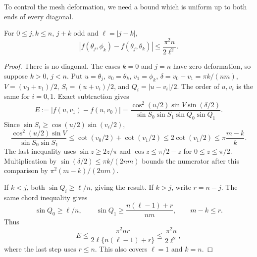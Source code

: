 To control the mesh deformation, we need a bound which is uniform up
to both ends of every diagonal.

\begin{lemma}
\label{lem:asym-details-deformation}
For $0\leq j,k\leq n$, $j+k$ odd and $\ell=|j-k|$,
\begin{equation}\label{eq:asym-details-deformation-bound}
 |f(\theta_j,\phi_k)-f(\theta_j,\theta_k)|
       \leq\frac{\pi^2n}{2\ell^2}.
\end{equation}
\end{lemma}

\begin{proof}
There is no diagonal.  The cases $k=0$ and $j=n$ have zero
deformation, so suppose $k>0$, $j<n$.  Put
$u=\theta_j$, $v_0=\theta_k$, $v_1=\phi_k$,
$\delta=v_0-v_1=\pi k/(nm)$, $V=(v_0+v_1)/2$,
$S_i=(u+v_i)/2$, and $Q_i=|u-v_i|/2$.  The order of $u,v_i$
is the same for $i=0,1$.  Exact subtraction gives
\[
 E:=|f(u,v_1)-f(u,v_0)|
 =\frac{\cos^2(u/2)\sin V\sin(\delta/2)}
        {\sin S_0\sin S_1\sin Q_0\sin Q_1}.
\]
Since $\sin S_i\geq\cos(u/2)\sin(v_i/2)$,
\[
 \frac{\cos^2(u/2)\sin V}{\sin S_0\sin S_1}
 \leq\cot(v_0/2)+\cot(v_1/2)
 \leq2\cot(v_1/2)\leq\pi\frac{m-k}{k}.
\]
The last inequality uses $\sin z\geq2z/\pi$ and
$\cos z\leq\pi/2-z$ for $0\leq z\leq\pi/2$.
Multiplication by $\sin(\delta/2)\leq\pi k/(2nm)$ bounds
the numerator after this comparison by $\pi^2(m-k)/(2nm)$.

If $k<j$, both $\sin Q_i\geq\ell/n$, giving the result.
If $k>j$, write $r=n-j$.  The same chord inequality gives
\[
 \sin Q_0\geq\ell/n,\qquad
 \sin Q_1\geq\frac{n(\ell-1)+r}{nm},\qquad m-k\leq r.
\]
Thus
\[
 E\leq\frac{\pi^2nr}{2\ell\{n(\ell-1)+r\}}
       \leq\frac{\pi^2n}{2\ell^2},
\]
where the last step uses $r\leq n$.  This also covers
$\ell=1$ and $k=n$.
\end{proof}

